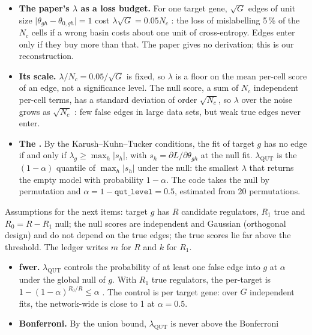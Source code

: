 \documentclass[11pt,a4paper]{article}
\begin{document}
\begin{methodbox}[title={Where the two levels come from, and what they control (our reading)}]
\begin{itemize}
  \item \textbf{The paper's $\lambda$ as a loss budget.} For one target gene, $\sqrt G$ edges of unit size
        $\lvert\theta_{gh}-\theta_{0,gh}\rvert=1$ cost $\lambda\sqrt G=0.05N_c$ : the loss of
        mislabelling 5\,\% of the $N_c$ cells if a wrong basin costs about one unit of cross-entropy. Edges
        enter only if they buy more than that. The paper gives no derivation; this is our reconstruction.
  \item \textbf{Its scale.} $\lambda/N_c=0.05/\sqrt G$ is fixed, so $\lambda$ is a floor on the mean
        per-cell score of an edge, not a significance level. The null score, a sum of $N_c$ independent
        per-cell terms, has a standard deviation of order $\sqrt{N_c}$, so $\lambda$ over the noise grows as
        $\sqrt{N_c}$ : few false edges in large data sets, but weak true edges never enter.
  \item \textbf{The .} By the Karush--Kuhn--Tucker conditions, the fit of target $g$ has no
        edge if and only if $\lambda_g\ge\max_h\lvert s_h\rvert$, with $s_h=\partial L/\partial\theta_{gh}$ at
        the null fit. $\lambda_{\mathrm{QUT}}$ is the $(1-\alpha)$ quantile of $\max_h\lvert s_h\rvert$ under the
        null: the smallest $\lambda$ that returns the empty model with probability $1-\alpha$. The code takes
        the null by permutation and $\alpha=1-\texttt{qut\_level}=0.5$, estimated from 20 permutations.
\end{itemize}
Assumptions for the next items: target $g$ has $R$ candidate regulators, $R_1$ true and $R_0=R-R_1$ null;
the null scores are independent and Gaussian (orthogonal design) and do not depend on the true edges; the
true scores lie far above the threshold. The ledger writes $m$ for $R$ and $k$ for $R_1$.
\begin{itemize}
  \item \textbf{\gls{fwer}.} $\lambda_{\mathrm{QUT}}$ controls the probability of at least one false edge
        into $g$ at $\alpha$ under the global null of $g$. With $R_1$ true regulators, the per-target
         is $1-(1-\alpha)^{R_0/R}\le\alpha$ . The control is per target gene: over
        $G$ independent fits, the network-wide  is close to 1 at $\alpha=0.5$.
  \item \textbf{Bonferroni.} By the union bound, $\lambda_{\mathrm{QUT}}$ is never above the Bonferroni

\end{itemize}
\end{methodbox}
\end{document}
